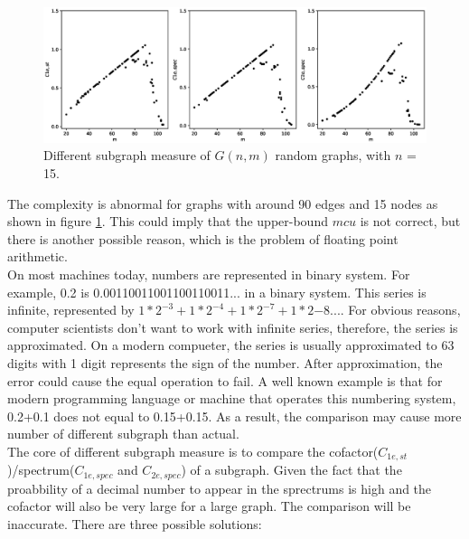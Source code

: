 \documentclass[12pt]{article}
\begin{document}
\begin{figure}[ht]
    \includegraphics[width=\textwidth]{subgraph_measures.eps}
    \caption{Different subgraph measure of $G(n,m)$ random graphs, with $n$ = 15.}
    \label{fig:subgraph_measure}
\end{figure}
\noindent
The complexity is abnormal for graphs with around 90 edges and 15 nodes as shown in figure \ref{fig:subgraph_measure}. This could imply that the upper-bound $mcu$ is not correct, but there is another possible reason, which is the problem of floating point arithmetic.\\
On most machines today, numbers are represented in binary system\cite{floating_point}. For example, 0.2 is 0.00110011001100110011... in a binary system. This series is infinite, represented by $1*2^{-3}+1*2^{-4}+1*2^{-7}+1*2{-8}...$. For obvious reasons, computer scientists don't want to work with infinite series, therefore, the series is approximated. On a modern compueter, the series is usually approximated to 63 digits with 1 digit represents the sign of the number. After approximation, the error could cause the equal operation to fail. A well known example is that for modern programming language or machine that operates this numbering system, 0.2+0.1 does not equal to 0.15+0.15. As a result, the comparison may cause more number of different subgraph than actual.\\
The core of different subgraph measure is to compare the cofactor($C_{1e,st}$)/spectrum($C_{1e,spec}$ and $C_{2e,spec}$) of a subgraph. Given the fact that the proabbility of a decimal number to appear in the sprectrums is high and the cofactor will also be very large for a large graph. The comparison will be inaccurate. There are three possible solutions:
\end{document}
